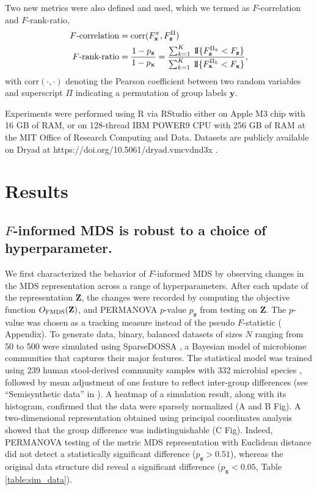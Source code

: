 \documentclass[10pt,letterpaper]{article}
\newcommand{\1}{{\rm 1}\kern-0.24em{\rm I}}
\begin{document}
Two new metrics were also defined and used, which we termed as $F$-correlation and $F$-rank-ratio,
\begin{equation}
\begin{aligned}
    F\text{-correlation} &= \text{corr}(F_\mathbf{x}^\pi, F_\mathbf{z}^\Pi) \\
    F\text{-rank-ratio} &= \frac{1-p_\mathbf{z}}{1-p_\mathbf{x}} = \frac{\sum_{k=1}^K\,\1\{F_\mathbf{z}^{\Pi_k} < F_\mathbf{z}\}}{\sum_{k=1}^K\,\1\{F_\mathbf{x}^{\Pi_k} < F_\mathbf{x}\}},
    \label{eq:def_f_metrics}
\end{aligned}
\end{equation}
with $\text{corr}(\cdot,\cdot)$ denoting the Pearson coefficient between two random variables and superscript $\Pi$ indicating a permutation of group labels $\mathbf{y}$.

Experiments were performed using R via RStudio either on Apple M3 chip with 16 GB of RAM, or on 128-thread IBM POWER9 CPU with 256 GB of RAM at the MIT Office of Research Computing and Data. Datasets are publicly available on Dryad at https://doi.org/10.5061/dryad.vmcvdnd3x \cite{Kim25}.



\section*{Results}
\subsection*{$F$-informed MDS is robust to a choice of hyperparameter.}
We first characterized the behavior of $F$-informed MDS by observing changes in the MDS representation across a range of hyperparameters. After each update of the representation $\mathbf{Z}$, the changes were recorded by computing the objective function $O_{\rm FMDS}(\mathbf{Z})$, and PERMANOVA $p$-value $p_\mathbf{z}$ from testing on $\mathbf{Z}$. The $p$-value was chosen as a tracking measure instead of the pseudo $F$-statistic ( Appendix). To generate data, binary, balanced datasets of sizes $N$ ranging from 50 to 500 were simulated using SparseDOSSA \cite{Ma21}, a Bayesian model of microbiome communities that captures their major features. The statistical model was trained using 239 human stool-derived community samples with 332 microbial species \cite{Lloyd17}, followed by mean adjustment of one feature to reflect inter-group differences (see ``Semisynthetic data'' in ). A heatmap of a simulation result, along with its histogram, confirmed that the data were sparsely normalized (A and B Fig). A two-dimensional representation obtained using principal coordinates analysis showed that the group difference was indistinguishable (C Fig). Indeed, PERMANOVA testing of the metric MDS representation with Euclidean distance did not detect a statistically significant difference ($p_\mathbf{z}>0.51$), whereas the original data structure did reveal a significant difference ($p_\mathbf{x}<0.05$, Table \ref{table:sim_data}).
\end{document}
